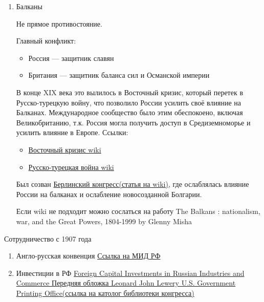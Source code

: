 \documentclass[a4paper, 12pt]{article}
\begin{document}
\begin{enumerate}
\begin{enumerate}
		\end{enumerate}
		
		\item {\Large Балканы} \newline
		
		Не прямое противостояние.			
		
		Главный конфликт:
		\begin{itemize}
			\item Россия — защитник славян
			\item Британия — защитник баланса сил и Османской империи
		\end{itemize}
		
		В конце XIX века это вылилось в Восточный кризис, который перетек в Русско-турецкую войну, что позволило России усилить своё влияние на Балканах. Международное сообщество было этим обеспокоено, включая Великобританию, т.к. Россия могла получить доступ в Средиземноморье и усилить влияние в Европе. Ссылки:
		\begin{itemize}
			\item \href{https://en.wikipedia.org/wiki/Great_Eastern_Crisis}{Восточный кризис wiki}
			\item \href{https://en.wikipedia.org/wiki/Russo-Turkish_War_(1877%E2%80%931878)?ysclid=mmrli98mdm592441455}{Русско-турецкая война wiki}
		\end{itemize}
		Был созван \href{https://en.wikipedia.org/wiki/Congress_of_Berlin}{Берлинский конгресс(статья на wiki)}, где ослаблялась влияние России на балканах и ослабление новосозданной Болгарии.
		
		Если wiki не подходит можно сослаться на работу The Balkans : nationalism, war, and the Great Powers, 1804-1999
		by Glenny Misha
	
	
	\end{enumerate}
	
	{\centering \Huge Сотрудничество с 1907 года}
	\begin{enumerate}
		\item {\Large Англо-русская конвенция}
		\href{https://idd.mid.ru/informational_materials/russko-angliyskoe-soglashenie-o-razdele-sfer-vliyaniya-1907-goda/}{Ссылка на МИД РФ}
		\item {\Large Инвестиции в РФ}
		\href{https://www.loc.gov/item/23027480/}{Foreign Capital Investments in Russian Industries and Commerce
			Передняя обложка
			Leonard John Lewery
			U.S. Government Printing Office(ссылка на католог библиотеки конгресса)}
		
		
	\end{enumerate}
\end{document}
